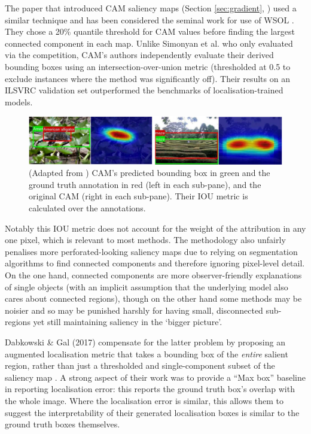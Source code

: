 \documentclass[main]{subfiles}
\begin{document}
The paper that introduced CAM saliency maps (Section \ref{sec:gradient}, \cite{cam}) used a similar technique and has been considered the seminal work for use of WSOL \cite{choe}. They chose a 20\% quantile threshold for CAM values before finding the largest connected component in each map. Unlike Simonyan et al. who only evaluated via the competition, CAM's authors independently evaluate their derived bounding boxes using an intersection-over-union metric (thresholded at 0.5 to exclude instances where the method was significantly off). Their results on an ILSVRC validation set outperformed the benchmarks of localisation-trained models.

\begin{figure}[h]
\centering
\includegraphics[scale=0.4]{iou_litreview.png}
\caption{(Adapted from \cite{cam}) CAM's predicted bounding box in green and the ground truth annotation in red  (left in each sub-pane), and the original CAM (right in each sub-pane). Their IOU metric is calculated over the annotations.}
\label{adebayoimg}
\end{figure}

Notably this IOU metric does not account for the weight of the attribution in any one pixel, which is relevant to most methods. The methodology also unfairly penalises more perforated-looking saliency maps due to relying on segmentation algorithms to find connected components and therefore ignoring pixel-level detail. On the one hand, connected components are more observer-friendly explanations of single objects (with an implicit assumption that the underlying model also cares about connected regions), though on the other hand some methods may be noisier and so may be punished harshly for having small, disconnected sub-regions yet still maintaining saliency in the `bigger picture'.

Dabkowski \& Gal (2017) compensate for the latter problem by proposing an augmented localisation metric that takes a bounding box of the \textit{entire} salient region, rather than just a thresholded and single-component subset of the saliency map \cite{dabowski}. A strong aspect of their work was to provide a ``Max box'' baseline in reporting localisation error: this reports the ground truth box's overlap with the whole image. Where the localisation error is similar, this allows them to suggest the interpretability of their generated localisation boxes is similar to the ground truth boxes themselves.
\end{document}
